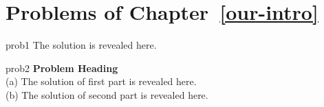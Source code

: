 

\section*{Problems of Chapter~\ref{our-intro}}

\begin{sol}{prob1}
The solution is revealed here.
\end{sol}


\begin{sol}{prob2}
\textbf{Problem Heading}\\
(a) The solution of first part is revealed here.\\
(b) The solution of second part is revealed here.
\end{sol}

